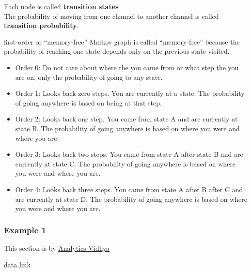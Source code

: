 \documentclass[
]{book}
\providecommand{\tightlist}{%
  \setlength{\itemsep}{0pt}\setlength{\parskip}{0pt}}
\begin{document}
Each node is called \textbf{transition states}\\
The probability of moving from one channel to another channel is called \textbf{transition probability}.

first-order or ``memory-free'' Markov graph is called ``memory-free'' because the probability of reaching one state depends
only on the previous state visited.

\begin{itemize}
\tightlist
\item
  Order 0: Do not care about where the you came from or what step the you are on, only the probability of going to any
  state.
\item
  Order 1: Looks back zero steps. You are currently at a state. The probability of going anywhere is based on being at
  that step.
\item
  Order 2: Looks back one step. You came from state A and are currently at state B. The probability of going anywhere
  is based on where you were and where you are.
\item
  Order 3: Looks back two steps. You came from state A after state B and are currently at state C. The probability of
  going anywhere is based on where you were and where you are.
\item
  Order 4: Looks back three steps. You came from state A after B after C and are currently at state D. The probability
  of going anywhere is based on where you were and where you are.
\end{itemize}

\hypertarget{example-1-1}{%
\subsubsection{Example 1}\label{example-1-1}}

This section is by \href{https://www.analyticsvidhya.com/blog/2018/01/channel-attribution-modeling-using-markov-chains-in-r/}{Analytics
Vidhya}

\href{https://www.dropbox.com/s/wi907ms4h4cl1p0/Channel_attribution.csv?dl=0}{data link}
\end{document}
